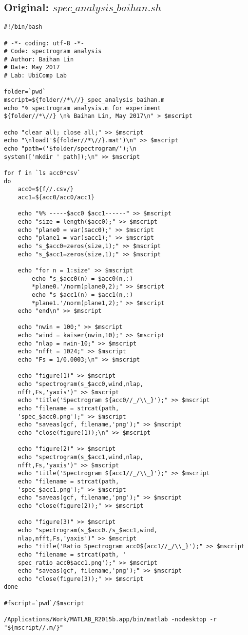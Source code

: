 \documentclass{sigchi}
\begin{document}
\subsection{Original: $spec\_analysis\_baihan.sh$}\label{ss:spc_ana.sh}
\begin{lstlisting}
#!/bin/bash

# -*- coding: utf-8 -*-
# Code: spectrogram analysis
# Author: Baihan Lin
# Date: May 2017
# Lab: UbiComp Lab

folder=`pwd`
mscript=${folder//*\//}_spec_analysis_baihan.m
echo "% spectrogram analysis.m for experiment 
${folder//*\//} \n% Baihan Lin, May 2017\n" > $mscript

echo "clear all; close all;" >> $mscript
echo "\nload('${folder//*\//}.mat')\n" >> $mscript
echo "path=('$folder/spectrogram/');\n
system(['mkdir ' path]);\n" >> $mscript

for f in `ls acc0*csv`
do
    acc0=${f//.csv/}
    acc1=${acc0/acc0/acc1}

	echo "%% -----$acc0 $acc1------" >> $mscript
	echo "size = length($acc0);" >> $mscript
	echo "plane0 = var($acc0);" >> $mscript
	echo "plane1 = var($acc1);" >> $mscript
	echo "s_$acc0=zeros(size,1);" >> $mscript
	echo "s_$acc1=zeros(size,1);" >> $mscript
	
	echo "for n = 1:size" >> $mscript
    	echo "s_$acc0(n) = $acc0(n,:)
        *plane0.'/norm(plane0,2);" >> $mscript
    	echo "s_$acc1(n) = $acc1(n,:)
        *plane1.'/norm(plane1,2);" >> $mscript
	echo "end\n" >> $mscript

	echo "nwin = 100;" >> $mscript
	echo "wind = kaiser(nwin,10);" >> $mscript
	echo "nlap = nwin-10;" >> $mscript
	echo "nfft = 1024;" >> $mscript
	echo "Fs = 1/0.0003;\n" >> $mscript

	echo "figure(1)" >> $mscript
	echo "spectrogram(s_$acc0,wind,nlap,
    nfft,Fs,'yaxis')" >> $mscript
	echo "title('Spectrogram ${acc0//_/\\_}');" >> $mscript
	echo "filename = strcat(path, 
    'spec_$acc0.png');" >> $mscript
	echo "saveas(gcf, filename,'png');" >> $mscript
	echo "close(figure(1));\n" >> $mscript

	echo "figure(2)" >> $mscript
	echo "spectrogram(s_$acc1,wind,nlap,
    nfft,Fs,'yaxis')" >> $mscript
	echo "title('Spectrogram ${acc1//_/\\_}');" >> $mscript
	echo "filename = strcat(path, 
    'spec_$acc1.png');" >> $mscript
	echo "saveas(gcf, filename,'png');" >> $mscript
	echo "close(figure(2));" >> $mscript

	echo "figure(3)" >> $mscript
	echo "spectrogram(s_$acc0./s_$acc1,wind,
    nlap,nfft,Fs,'yaxis')" >> $mscript
	echo "title('Ratio Spectrogram acc0${acc1//_/\\_}');" >> $mscript
	echo "filename = strcat(path, '
    spec_ratio_acc0$acc1.png');" >> $mscript
	echo "saveas(gcf, filename,'png');" >> $mscript
	echo "close(figure(3));" >> $mscript
done

#fscript=`pwd`/$mscript

/Applications/Work/MATLAB_R2015b.app/bin/matlab -nodesktop -r "${mscript//.m/}"

\end{lstlisting}
\end{document}

